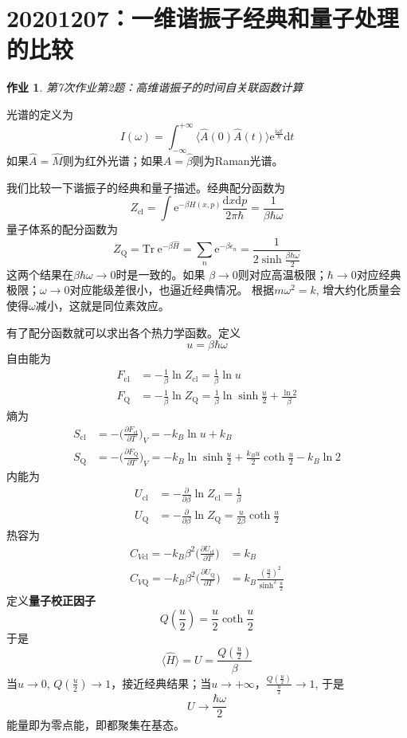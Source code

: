 \documentclass[12pt]{article}
\newtheorem{asg}{作业}
\begin{document}
\section{20201207：一维谐振子经典和量子处理的比较}

\begin{asg}
    第7次作业第2题：高维谐振子的时间自关联函数计算
\end{asg}

光谱的定义为
\[ I(\omega) = \int_{-\infty}^{+\infty} \langle \hat{A}(0)\hat{A}(t)\rangle \mathrm{e}^{\frac {\mathrm{i}\omega t}{\hbar}} \mathrm{d}t \]
如果$\hat{A} = \hat{M}$则为红外光谱；如果$\hat{A} = \hat{\beta}$则为Raman光谱。

我们比较一下谐振子的经典和量子描述。经典配分函数为
\[ Z_\mathrm{cl} = \int \mathrm{e}^{-\beta H(x,p)}\frac {\mathrm{d}x\mathrm{d}p}{2\pi\hbar} = \frac 1{\beta\hbar\omega} \]
量子体系的配分函数为
\[ Z_\mathrm{Q} = \mathrm{Tr} \ \mathrm{e}^{-\beta \hat{H}} = \sum_n \mathrm{e}^{-\beta\epsilon_n} = \frac 1{2\sinh{\frac {\beta\hbar\omega}2}} \]
这两个结果在$\beta\hbar\omega \to 0$时是一致的。如果
$\beta \to 0$则对应高温极限；$\hbar \to 0$对应经典极限；$\omega \to 0$对应能级差很小，也逼近经典情况。
根据$m\omega^2 = k$, 增大约化质量会使得$\omega$减小，这就是同位素效应。

有了配分函数就可以求出各个热力学函数。定义
\[ u = \beta\hbar\omega \]
自由能为
\begin{align*}
    F_\mathrm{cl} &= -\frac 1{\beta} \ln{Z_\mathrm{cl}} = \frac 1{\beta} \ln{u}\\
    F_\mathrm{Q} &= -\frac 1{\beta} \ln{Z_\mathrm{Q}} = \frac 1{\beta}\ln{\sinh{\frac u2}}+ \frac {\ln{2}}{\beta}
\end{align*}
熵为
\begin{align*}
    S_\mathrm{cl} &= -\bigg(\frac {\partial F_{\mathrm{cl}}}{\partial T}\bigg)_V = -k_B \ln{u} + k_B\\
    S_\mathrm{Q} &= -\bigg(\frac {\partial F_{\mathrm{Q}}}{\partial T}\bigg)_V = -k_B \ln{\sinh{\frac u2}} + \frac {k_Bu}2 \coth{\frac u2} - k_B \ln{2}
\end{align*}
内能为
\begin{align*}
    U_\mathrm{cl} &= -\frac {\partial}{\partial \beta}\ln{Z_\mathrm{cl}} = \frac 1{\beta}\\
    U_\mathrm{Q} &= -\frac {\partial}{\partial \beta}\ln{Z_\mathrm{Q}} = \frac {u}{2\beta} \coth{\frac u2}
\end{align*}
热容为
\begin{align*}
    C_{V\mathrm{cl}} = -k_B \beta^2 \bigg(\frac {\partial U_\mathrm{cl}}{\partial T}) &= k_B\\
    C_{V\mathrm{Q}} = -k_B \beta^2 \bigg(\frac {\partial U_\mathrm{Q}}{\partial T}) &= k_B \frac {(\frac u2)^2}{\sinh^2{\frac u2}}
\end{align*}
定义\textbf{量子校正因子}
\[ Q(\frac u2) = \frac u2 \coth{\frac u2} \]
于是 
\[ \langle \hat{H} \rangle = U = \frac {Q(\frac u2)}{\beta} \]
当$u \to 0$, $Q(\frac u2) \to 1$，接近经典结果；当$u \to +\infty$，$\frac {Q(\frac u2)}{\frac u2} \to 1$, 于是
\[U \to \frac {\hbar \omega}2 \]
能量即为零点能，即都聚集在基态。
\end{document}
